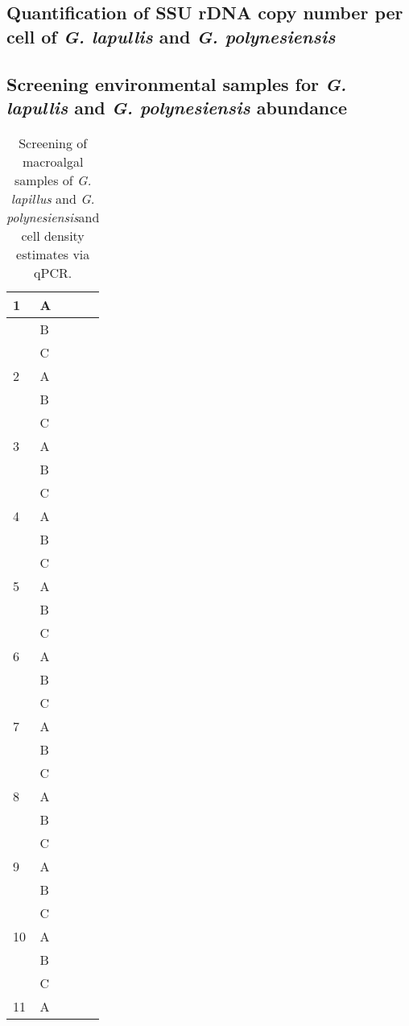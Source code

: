 \documentclass[12pt]{article}
\begin{document}
\subsection{Quantification of SSU rDNA copy number per cell of \emph{G. lapullis} and \emph{G. polynesiensis}}

\subsection{Screening environmental samples for \emph{G. lapullis} and \emph{G. polynesiensis} abundance}
\FloatBarrier
\begin{longtable}{ | p{1cm} | p{1cm} | p{3cm} | p{4cm} | p{4cm} | }
\caption{Screening of macroalgal samples of \emph{G. lapillus} and \emph{G. polynesiensis}and cell density estimates via qPCR.}\\
\hline
\label{tbl:MacroalgaeTable}
1&A&&&\\
\hline
&B&&&\\
\hline
&C&&&\\
\hline
2&A&&&\\
\hline
&B&&&\\
\hline
&C&&&\\
\hline
3&A&&&\\
\hline
&B&&&\\
\hline
&C&&&\\
\hline
4&A&&&\\
\hline
&B&&&\\
\hline
&C&&&\\
\hline
5&A&&&\\
\hline
&B&&&\\
\hline
&C&&&\\
\hline
6&A&&&\\
\hline
&B&&&\\
\hline
&C&&&\\
\hline
7&A&&&\\
\hline
&B&&&\\
\hline
&C&&&\\
\hline
8&A&&&\\
\hline
&B&&&\\
\hline
&C&&&\\
\hline
9&A&&&\\
\hline
&B&&&\\
\hline
&C&&&\\
\hline
10&A&&&\\
\hline
&B&&&\\
\hline
&C&&&\\
\hline
11&A&&&\\

\end{longtable}
\end{document}

